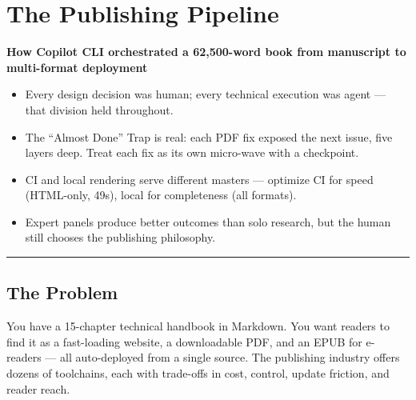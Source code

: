 \documentclass[
  a4paper,
  DIV=11,
  numbers=noendperiod]{scrreprt}
\providecommand{\tightlist}{%
  \setlength{\itemsep}{0pt}\setlength{\parskip}{0pt}}
\begin{document}
\chapter{The Publishing Pipeline}\label{the-publishing-pipeline}

\textbf{How Copilot CLI orchestrated a 62,500-word book from manuscript
to multi-format deployment}

\begin{tcolorbox}[enhanced jigsaw, arc=.35mm, bottomrule=.15mm, bottomtitle=1mm, breakable, colback=white, colbacktitle=quarto-callout-tip-color!10!white, colframe=quarto-callout-tip-color-frame, coltitle=black, left=2mm, leftrule=.75mm, opacityback=0, opacitybacktitle=0.6, rightrule=.15mm, title=\textcolor{quarto-callout-tip-color}{\faLightbulb}\hspace{0.5em}{Key Takeaways --- The TL;DR}, titlerule=0mm, toprule=.15mm, toptitle=1mm]

\begin{itemize}
\tightlist
\item
  Every design decision was human; every technical execution was agent
  --- that division held throughout.
\item
  The ``Almost Done'' Trap is real: each PDF fix exposed the next issue,
  five layers deep. Treat each fix as its own micro-wave with a
  checkpoint.
\item
  CI and local rendering serve different masters --- optimize CI for
  speed (HTML-only, 49s), local for completeness (all formats).
\item
  Expert panels produce better outcomes than solo research, but the
  human still chooses the publishing philosophy.
\end{itemize}

\end{tcolorbox}

\begin{center}\rule{0.5\linewidth}{0.5pt}\end{center}

\section{The Problem}\label{the-problem-1}

You have a 15-chapter technical handbook in Markdown. You want readers
to find it as a fast-loading website, a downloadable PDF, and an EPUB
for e-readers --- all auto-deployed from a single source. The publishing
industry offers dozens of toolchains, each with trade-offs in cost,
control, update friction, and reader reach.
\end{document}
